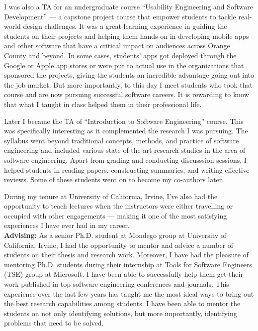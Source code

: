 \documentclass[a4paper]{article}
\begin{document}
I was also a TA for an undergraduate course \enquote{Usability Engineering and Software Development} --- a capstone project course that empower students to tackle real-world design challenges.
It was a great learning experience in guiding the students on their projects and helping them hands-on in developing mobile apps and other software that have a critical impact on audiences across Orange County and beyond. 
In some cases, students’ apps got deployed through the Google or Apple app stores or were put to actual use in the organizations that sponsored the projects, giving the students an incredible advantage going out into the job market.
But more importantly, to this day I meet students who took that course and are now pursuing successful software careers. It is rewarding to know that what I taught in class helped them in their professional life. 

Later I became the TA of \enquote{Introduction to Software Engineering} course. This was specifically interesting as it complemented the research I was pursuing. The syllabus went beyond traditional concepts, methods, and  practice of software engineering and included various state-of-the-art research studies in the area of software engineering. Apart from grading and conducting discusssion sessions, I helped students in reading papers, constructing summaries, and writing effective reviews.  Some of these students went on to become my co-authors later. 

During my tenure at University of California, Irvine, I've also had the opportunity to teach lectures when the instructors were either travelling or occupied with other engagements --- making it one of the most satisfying experiences I have ever had in my career. \\

\noindent \textbf{Advising:} As a senior Ph.D. student at Mondego group at University of California, Irvine, I had
the opportunity to mentor and advice a number of students on their thesis and research work.
Moreover, I have had the pleasure of mentoring Ph.D. students during their internship at Tools for Software Engineers (TSE) group at Microsoft.
I have been able to successfully help them get their work published in top software engineering conferences and journals. 
This experience over the last few years has taught me the most ideal ways to bring out the best research capabilities among students. I have
been able to mentor the students on not only identifying solutions, but more importantly, identifying problems that need to be solved.
\end{document}
